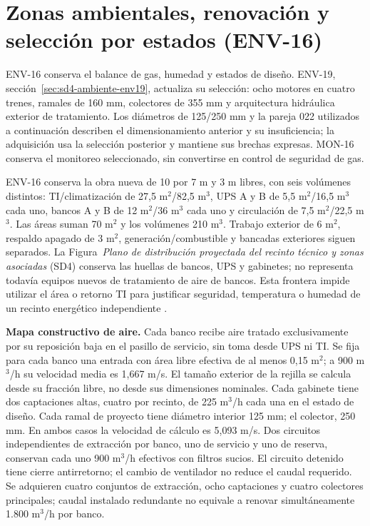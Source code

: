\section{Zonas ambientales, renovación y selección por estados (ENV-16)}
\label{sec:sd4-ambiente-env16}

ENV-16 conserva el balance de gas, humedad y estados de diseño. ENV-19, sección~\ref{sec:sd4-ambiente-env19}, actualiza su selección: ocho motores en cuatro trenes, ramales de 160 mm, colectores de 355 mm y arquitectura hidráulica exterior de tratamiento. Los diámetros de 125/250 mm y la pareja 022 utilizados a continuación describen el dimensionamiento anterior y su insuficiencia; la adquisición usa la selección posterior y mantiene sus brechas expresas. MON-16 conserva el monitoreo seleccionado, sin convertirse en control de seguridad de gas.

ENV-16 conserva la obra nueva de 10 por 7 m y 3 m libres, con seis volúmenes distintos: TI/climatización de 27,5 m$^2$/82,5 m$^3$, UPS A y B de 5,5 m$^2$/16,5 m$^3$ cada uno, bancos A y B de 12 m$^2$/36 m$^3$ cada uno y circulación de 7,5 m$^2$/22,5 m$^3$. Las áreas suman 70 m$^2$ y los volúmenes 210 m$^3$. Trabajo exterior de 6 m$^2$, respaldo apagado de 3 m$^2$, generación/combustible y bancadas exteriores siguen separados. La Figura~\emph{Plano de distribución proyectada del recinto técnico y zonas asociadas} (SD4) conserva las huellas de bancos, UPS y gabinetes; no representa todavía equipos nuevos de tratamiento de aire de bancos. Esta frontera impide utilizar el área o retorno TI para justificar seguridad, temperatura o humedad de un recinto energético independiente \parencite[RT-06.03/13/14]{pucv-transversal}.

\textbf{Mapa constructivo de aire.} Cada banco recibe aire tratado exclusivamente por su reposición baja en el pasillo de servicio, sin toma desde UPS ni TI. Se fija para cada banco una entrada con área libre efectiva de al menos 0,15 m$^2$; a 900 m$^3$/h su velocidad media es 1,667 m/s. El tamaño exterior de la rejilla se calcula desde su fracción libre, no desde sus dimensiones nominales. Cada gabinete tiene dos captaciones altas, cuatro por recinto, de 225 m$^3$/h cada una en el estado de diseño. Cada ramal de proyecto tiene diámetro interior 125 mm; el colector, 250 mm. En ambos casos la velocidad de cálculo es 5,093 m/s. Dos circuitos independientes de extracción por banco, uno de servicio y uno de reserva, conservan cada uno 900 m$^3$/h efectivos con filtros sucios. El circuito detenido tiene cierre antirretorno; el cambio de ventilador no reduce el caudal requerido. Se adquieren cuatro conjuntos de extracción, ocho captaciones y cuatro colectores principales; caudal instalado redundante no equivale a renovar simultáneamente 1.800 m$^3$/h por banco.

